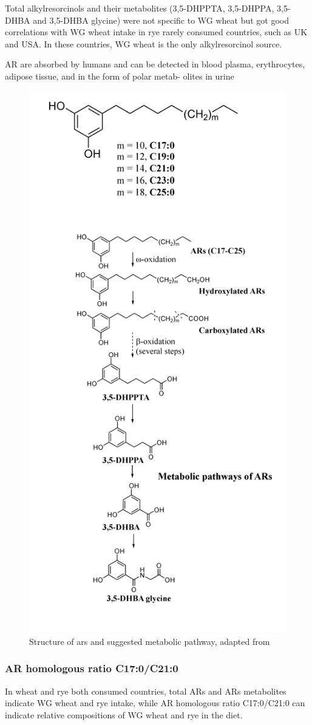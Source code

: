 Total alkylresorcinols and their metabolites (3,5-DHPPTA, 3,5-DHPPA, 3,5-DHBA and 3,5-DHBA glycine) were not specific to WG wheat but got good correlations with WG wheat intake in rye rarely consumed countries, such as UK and USA. In these countries, WG wheat is the only alkylresorcinol source.

AR are absorbed by humans and can be detected in blood plasma, erythrocytes, adipose tissue, and in the form of polar metab- olites in urine

\begin{figure}[h!]
	\centering
	\includegraphics[width=0.5\linewidth]{picture/ars_sang_pathway}
	\caption{Structure of \acrshort{ars} and suggested metabolic pathway, adapted from \cite{ISI:000447355100002}}
	\label{fig:structure_ars}
\end{figure}

\subsubsection{AR homologous ratio C17:0/C21:0}
In wheat and rye both consumed countries, total ARs and ARs metabolites indicate WG wheat and rye intake, while AR homologous ratio C17:0/C21:0 can indicate relative compositions of WG wheat and rye in the diet.


